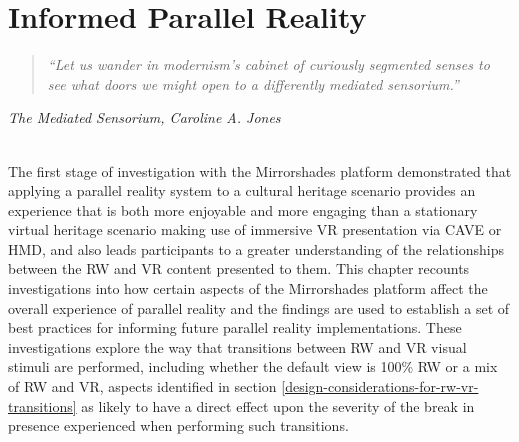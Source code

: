 

\chapter{Informed Parallel Reality}


\begin{quote}
	\textit{``Let us wander in modernism's cabinet of curiously segmented senses to see what doors we might open to a differently mediated sensorium.''}
\end{quote}
\hfill \textit{The Mediated Sensorium, Caroline A. Jones}
\\
\\


\label{chapter-eval-2}

The first stage of investigation with the Mirrorshades platform demonstrated that applying a parallel reality system to a cultural heritage scenario provides an experience that is both more enjoyable and more engaging than a stationary virtual heritage scenario making use of immersive VR presentation via CAVE or HMD, and also leads participants to a greater understanding of the relationships between the RW and VR content presented to them. This chapter recounts investigations into how certain aspects of the Mirrorshades platform affect the overall experience of parallel reality and the findings are used to establish a set of best practices for informing future parallel reality implementations. These investigations explore the way that transitions between RW and VR visual stimuli are performed, including whether the default view is 100\% RW or a mix of RW and VR, aspects identified in section \ref{design-considerations-for-rw-vr-transitions} as likely to have a direct effect upon the severity of the break in presence experienced when performing such transitions.

